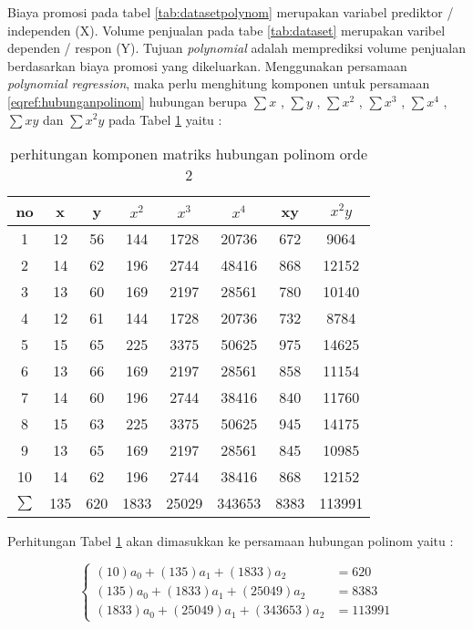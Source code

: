 Biaya promosi pada tabel \ref{tab:datasetpolynom} merupakan variabel prediktor / independen (X). Volume penjualan pada tabe \ref{tab:dataset} merupakan varibel dependen / respon (Y). Tujuan \textit{polynomial} adalah memprediksi volume penjualan berdasarkan biaya promosi yang dikeluarkan. Menggunakan persamaan \textit{polynomial regression}, maka perlu menghitung komponen untuk persamaan \eqref{eqref:hubunganpolinom} hubungan berupa $\sum x$ , $\sum y$ , $\sum x^2$ , $\sum x^3$ , $\sum x^4$ , $\sum xy$ dan $\sum x^2 y$ pada Tabel \ref{tab:tabelhubunganpolinomcontoh}  yaitu :  

\begin{table}[ht]
\centering 
\begin{tabular}{|c|c|c|c|c|c|c|c|}
\hline 
no & x & y & $x^2$ & $x^3$ & $x^4$ & xy & $x^2 y$ \\ 
\hline 
1 & 12 & 56 & 144 & 1728 & 20736 & 672 & 9064 \\ 
\hline 
2 & 14 & 62 & 196 & 2744 & 48416 & 868 & 12152 \\ 
\hline 
3 & 13 & 60 & 169 & 2197 & 28561 & 780 & 10140 \\ 
\hline 
4 & 12 & 61 & 144 & 1728 & 20736 & 732 & 8784 \\ 
\hline 
5 & 15 & 65 & 225 & 3375 & 50625 & 975 & 14625 \\ 
\hline 
6 & 13 & 66 & 169 & 2197 & 28561 & 858 & 11154 \\ 
\hline 
7 & 14 & 60 & 196 & 2744 & 38416 & 840 & 11760 \\ 
\hline 
8 & 15 & 63 & 225 & 3375 & 50625 & 945 & 14175 \\ 
\hline 
9 & 13 & 65 & 169 & 2197 & 28561 & 845 & 10985 \\ 
\hline 
10 & 14 & 62 & 196 & 2744 & 38416 & 868 & 12152 \\ 
\hline 
$\sum  $ & 135 & 620 & 1833 & 25029 & 343653 & 8383 & 113991 \\ 
\hline 
\end{tabular} 
\caption{perhitungan komponen matriks hubungan polinom orde 2}
\label{tab:tabelhubunganpolinomcontoh}
\end{table}

Perhitungan Tabel \ref{tab:tabelhubunganpolinomcontoh} akan dimasukkan ke persamaan hubungan polinom yaitu : 

\begin{displaymath}
		\begin{cases}
		   	(10)a_0 + (135) a_1 + (1833)a_2 &= 620 \\
		   		(135) a_0 + (1833)a_1 + (25049)a_2 &= 8383 \\
		   		(1833)a_0 + (25049)a_1 + (343653)a_2 &= 113991	   
		\end{cases}  
\end{displaymath} 

